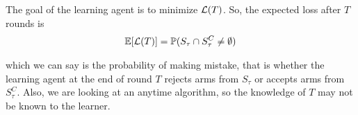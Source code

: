 The goal of the learning agent is to minimize $\mathcal{L} (T)$. So, the expected loss after $T$ rounds is 
\begin{align*}
\mathbb{E}[\mathcal{L}(T)] = \mathbb{P}(S_{\tau}\cap S_{\tau}^{C} \neq \emptyset)
\end{align*}

which we can say is the probability of making mistake, that is whether the learning agent at the end of round $T$ rejects arms from $S_{\tau}$ or accepts arms from $S_{\tau}^{C}$. Also, we are looking at an anytime algorithm, so the knowledge of $T$ may not be known to the learner.
